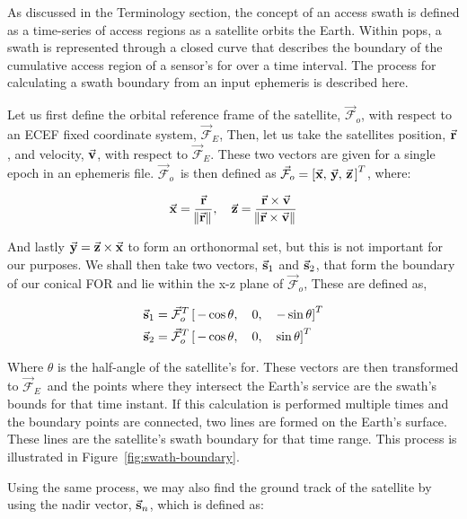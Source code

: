 As discussed in the Terminology section, the concept of an access swath is
defined as a time-series of access regions as a satellite orbits the Earth.
Within \gls{pops}, a swath is represented through a closed curve that describes
the boundary of the cumulative access region of a sensor’s \gls{for} over a
time interval. The process for calculating a swath boundary from an input
ephemeris is described here.  

\newcommand{\Fo}{$\vec{\mathcal{F}}_o$} 
\newcommand{\Fe}{$\vec{\mathcal{F}}_E$}

Let us first define the orbital reference frame of the satellite, \Fo, with
respect to an ECEF fixed coordinate system, \Fe,  Then, let us take the
satellites position, $\vec{\bm{\mathrm{r}}}$, and velocity, $\vec{\bm{\mathrm{v}}}$, with respect to \Fe.
These two vectors are given for a single epoch in an ephemeris file. \Fo ~is
then defined as $ \vec{\mathcal{F}}_o = \left[ \vec{\bm{\mathrm{x}}}, \, \vec{\bm{\mathrm{y}}}, \, \vec{\bm{\mathrm{z}}}
\, \right]^T$, where:

\begin{equation} 
    \vec{\bm{\mathrm{x}}} = \frac{\vec{\bm{\mathrm{r}}}}{\norm{\vec{\bm{\mathrm{r}}}}}, 
    \quad 
    \vec{\bm{\mathrm{z}}} = \frac{\vec{\bm{\mathrm{r}}}\times\vec{\bm{\mathrm{v}}}}{\norm{\vec{\bm{\mathrm{r}}}\times\vec{\bm{\mathrm{v}}}}}
\end{equation}

And lastly $\vec{\bm{\mathrm{y}}} = \vec{\bm{\mathrm{z}}} \times \vec{\bm{\mathrm{x}}}$ to form an orthonormal set, but
this is not important for our purposes. We shall then take two vectors,
$\vec{\bm{\mathrm{s}}}_{1}$ and $\vec{\bm{\mathrm{s}}}_{2}$, that form the boundary of our conical FOR and
lie within the x-z plane of \Fo,  These are defined as,

\begin{align}
    \vec{\bm{\mathrm{s}}}_{1} &= \vec{\mathcal{F}}_o^T \left[ \, -\cos\theta, \quad 0, \quad -\sin\theta \right]^T \\
    \vec{\bm{\mathrm{s}}}_{2} &= \vec{\mathcal{F}}_o^T \left[ \, -\cos\theta, \quad 0, \quad \sin\theta \right]^T
\end{align}

Where $\theta$ is the half-angle of the satellite’s \gls{for}. These vectors
are then transformed to \Fe~and the points where they intersect the Earth’s
service are the swath’s bounds for that time instant. If this calculation is
performed multiple times and the boundary points are connected, two lines are
formed on the Earth’s surface. These lines are the satellite’s swath boundary
for that time range.  This process is illustrated in
Figure~\ref{fig:swath-boundary}.

Using the same process, we may also find the ground track of the satellite by
using the nadir vector, $\vec{\bm{\mathrm{s}}}_{n}$, which is defined as:

